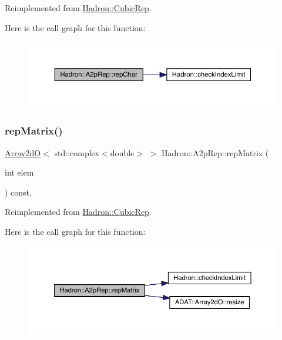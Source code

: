 Reimplemented from \mbox{\hyperlink{structHadron_1_1CubicRep_af45227106e8e715e84b0af69cd3b36f8}{Hadron\+::\+Cubic\+Rep}}.

Here is the call graph for this function\+:
\nopagebreak
\begin{figure}[H]
\begin{center}
\leavevmode
\includegraphics[width=350pt]{d4/d33/structHadron_1_1A2pRep_a7e7d7668295318bf08c6ab79ce2208e6_cgraph}
\end{center}
\end{figure}
\mbox{\label{structHadron_1_1A2pRep_aeede31465f59cff568c2ada0aa32ac37}} 
\subsubsection{\texorpdfstring{repMatrix()}{repMatrix()}\hspace{0.1cm}{\footnotesize\ttfamily [1/2]}}
{\footnotesize\ttfamily \mbox{\hyperlink{classADAT_1_1Array2dO}{Array2dO}}$<$ std\+::complex$<$double$>$ $>$ Hadron\+::\+A2p\+Rep\+::rep\+Matrix (\begin{DoxyParamCaption}\item[{int}]{elem }\end{DoxyParamCaption}) const\hspace{0.3cm}{\ttfamily [inline]}, {\ttfamily [virtual]}}



Reimplemented from \mbox{\hyperlink{structHadron_1_1CubicRep_ac5d7e9e6f4ab1158b5fce3e4ad9e8005}{Hadron\+::\+Cubic\+Rep}}.

Here is the call graph for this function\+:
\nopagebreak
\begin{figure}[H]
\begin{center}
\leavevmode
\includegraphics[width=350pt]{d4/d33/structHadron_1_1A2pRep_aeede31465f59cff568c2ada0aa32ac37_cgraph}
\end{center}
\end{figure}
\mbox{\label{structHadron_1_1A2pRep_aeede31465f59cff568c2ada0aa32ac37}} 
